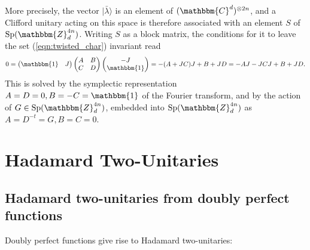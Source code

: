 \documentclass[aps,nofootinbib,floatfix,a4paper]{revtex4}
\newcommand{\1}{\mbox{$\mathbf{1}$}}
\def\ZZ{\mathbbm{Z}}
\def\CC{\mathbbm{C}}
\def\Id{\mathbbm{1}}
\DeclareMathOperator{\Sp}{Sp}
\begin{document}
More precisely, the vector $|\bar\lambda\rangle$ is an element of $(\CC^d)^{\otimes {2n}}$,
and a Clifford unitary acting on this space is therefore associated with an element $S$ of $\Sp(\ZZ_d^{4n})$.
Writing $S$ as a block matrix, the conditions for it to leave the set (\ref{eqn:twisted_char}) invariant read
\begin{align*}
	0
	=
	\begin{pmatrix}
		\Id & J
	\end{pmatrix}
	\begin{pmatrix}
		A & B \\
		C & D
	\end{pmatrix}
	\begin{pmatrix}
		-J\\
		\Id
	\end{pmatrix}
	=
	-(A + JC)J+ B + JD
	=
	-AJ - JCJ+ B + JD.
\end{align*}
This is solved by the symplectic representation $A=D=0, B=-C=\Id$ of the Fourier transform,
and by the action of $G\in\Sp(\ZZ_d^{4n})$, embedded into $\Sp(\ZZ_d^{4n})$ as $A=D^{-t}=G, B=C=0$.



\section{Hadamard Two-Unitaries}
\label{sec:hadamard}

\subsection{Hadamard two-unitaries from doubly perfect functions}

Doubly perfect functions give rise to Hadamard two-unitaries:

\hadamard*

%
\end{document}

